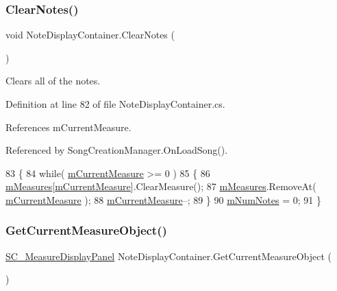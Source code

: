 \subsubsection{\texorpdfstring{Clear\+Notes()}{ClearNotes()}}
{\footnotesize\ttfamily void Note\+Display\+Container.\+Clear\+Notes (\begin{DoxyParamCaption}{ }\end{DoxyParamCaption})}



Clears all of the notes. 



Definition at line 82 of file Note\+Display\+Container.\+cs.



References m\+Current\+Measure.



Referenced by Song\+Creation\+Manager.\+On\+Load\+Song().


\begin{DoxyCode}
83     \{
84         \textcolor{keywordflow}{while}( \hyperlink{class_note_display_container_a79a97c9e0f45ba4242b66d6ec317d020}{mCurrentMeasure} >= 0 )
85         \{
86             \hyperlink{class_note_display_container_ae5ca6e7ea4ab2baaab9ff649bf25c0d6}{mMeasures}[\hyperlink{class_note_display_container_a79a97c9e0f45ba4242b66d6ec317d020}{mCurrentMeasure}].ClearMeasure();
87             \hyperlink{class_note_display_container_ae5ca6e7ea4ab2baaab9ff649bf25c0d6}{mMeasures}.RemoveAt( \hyperlink{class_note_display_container_a79a97c9e0f45ba4242b66d6ec317d020}{mCurrentMeasure} );
88             \hyperlink{class_note_display_container_a79a97c9e0f45ba4242b66d6ec317d020}{mCurrentMeasure}--;
89         \}
90         \hyperlink{class_note_display_container_a31be4fc67033a1dcb210819e0e90d7e6}{mNumNotes} = 0;
91     \}
\end{DoxyCode}
\mbox{\label{class_note_display_container_aa61de8a22ca340125208074a49c67478}} 
\subsubsection{\texorpdfstring{Get\+Current\+Measure\+Object()}{GetCurrentMeasureObject()}}
{\footnotesize\ttfamily \hyperlink{class_s_c___measure_display_panel}{S\+C\+\_\+\+Measure\+Display\+Panel} Note\+Display\+Container.\+Get\+Current\+Measure\+Object (\begin{DoxyParamCaption}{ }\end{DoxyParamCaption})}



